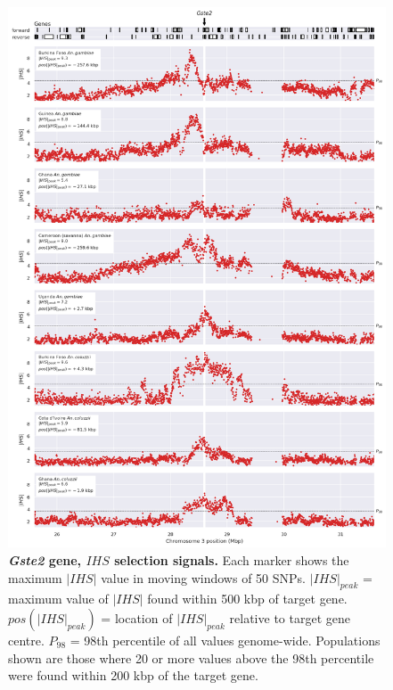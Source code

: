 \documentclass[a4paper,11pt,abstracton,hidelinks]{scrartcl}
\begin{document}
\begin{figure}[t!]
	\begin{center}
		\includegraphics*[width=1\linewidth,center]{artwork/locus_gste2_ihs_pdist.png}
	\end{center}
	\caption[\textit{Gste2} gene, $IHS$ selection signals]{
	\textbf{\textit{Gste2} gene, $IHS$ selection signals.}
	Each marker shows the maximum $|IHS|$ value in moving windows of 50 SNPs. 
	$|IHS|_{peak}$ = maximum value of $|IHS|$ found within 500 kbp of target gene. 
	$pos(|IHS|_{peak})$ = location of $|IHS|_{peak}$ relative to target gene centre.
	$P_{98}$ = 98th percentile of all values genome-wide.
	Populations shown are those where 20 or more values above the 98th percentile were found within 200 kbp of the target gene.
	} 
	\label{fig:locus_gste2_ihs}
\end{figure}
\end{document}
